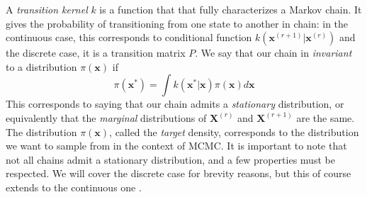 \documentclass[12pt]{memoir}
\newcommand{\mb}{\mathbf}
\newcommand{\ti}{\textit}
\begin{document}
A \ti{transition kernel} $k$ is a function that that fully characterizes a Markov chain. It gives the probability of transitioning from one state to another in chain: in the continuous case, this corresponds to conditional function $k(\mb x^{(r+1)}| \mb x^{(r)})$ and the discrete case, it is a transition matrix $P$. We say that our chain in \ti{invariant} to a distribution $\pi(\mb x)$ if 
\begin{equation}
    \pi(\mb x^*) = \int k(\mb x^*|\mb x) \pi(\mb x)d\mb x
\end{equation}
This corresponds to saying that our chain admits a \ti{stationary} distribution, or equivalently that the \ti{marginal} distributions of $\mb X^{(r)}$ and $\mb X^{(r+1)}$ are the same. The distribution $\pi(\mb x)$, called the \ti{target} density, corresponds to the distribution we want to sample from in the context of MCMC. It is important to note that not all chains admit a stationary distribution, and a few properties must be respected. We will cover the discrete case for brevity reasons, but this of course extends to the continuous one \cite{mcmc:slides:Rigon2024Mar,wiki:markov-chain}.
\end{document}
